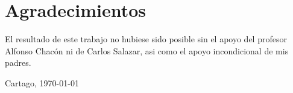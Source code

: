 \chapter*{Agradecimientos}
\thispagestyle{empty}

El resultado de este trabajo no hubiese sido posible sin el apoyo del profesor Alfonso Chacón ni de Carlos Salazar, asi como el apoyo incondicional de mis padres.

\vspace*{1cm}

\scriptAuthor

Cartago, \today

\cleardoublepage

